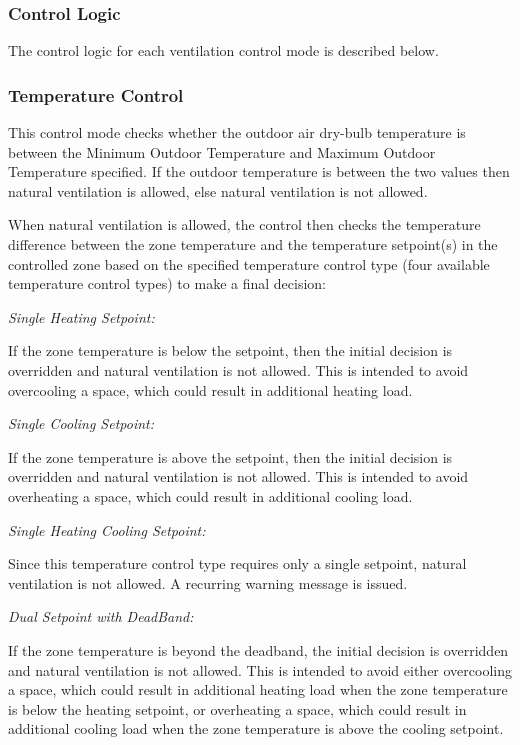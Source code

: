 \subsubsection{Control Logic}\label{control-logic-000}

The control logic for each ventilation control mode is described below.

\subsubsection{Temperature Control}\label{temperature-control}

This control mode checks whether the outdoor air dry-bulb temperature is between the Minimum Outdoor Temperature and Maximum Outdoor Temperature specified. If the outdoor temperature is between the two values then natural ventilation is allowed, else natural ventilation is not allowed.

When natural ventilation is allowed, the control then checks the temperature difference between the zone temperature and the temperature setpoint(s) in the controlled zone based on the specified temperature control type (four available temperature control types) to make a final decision:

\emph{Single Heating Setpoint:}

If the zone temperature is below the setpoint, then the initial decision is overridden and natural ventilation is not allowed. This is intended to avoid overcooling a space, which could result in additional heating load.

\emph{Single Cooling Setpoint:}

If the zone temperature is above the setpoint, then the initial decision is overridden and natural ventilation is not allowed. This is intended to avoid overheating a space, which could result in additional cooling load.

\emph{Single Heating Cooling Setpoint:}

Since this temperature control type requires only a single setpoint, natural ventilation is not allowed. A recurring warning message is issued.

\emph{Dual Setpoint with DeadBand:}

If the zone temperature is beyond the deadband, the initial decision is overridden and natural ventilation is not allowed. This is intended to avoid either overcooling a space, which could result in additional heating load when the zone temperature is below the heating setpoint, or overheating a space, which could result in additional cooling load when the zone temperature is above the cooling setpoint.

